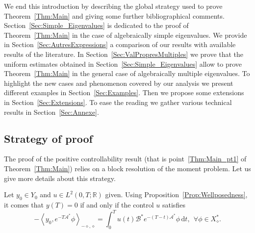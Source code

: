 \documentclass[10pt]{amsart}
\theoremstyle{definition}\newtheorem{defi}[theo]{Definition}\newtheorem{rema}[theo]{Remark}\newtheorem{exam}[theo]{Example}\newtheorem{exem}[theo]{Example}\newtheorem{nota}[theo]{Notation}
\newcommand\As{\mathcal{A}^*}
\newcommand\Bs{\mathcal{B}^*}
\newcommand{\Xalphas}{X_\diamond^*}
\newcommand{\Fzp}{Y_0}
\newcommand{\dual}[2]{\left\langle #1, #2 \right\rangle_{-\diamond,\diamond}}
\newcommand{\R}{\mathbb{R}}
\newcommand{\md}{\mathrm{d}}
\let\oldforall\forall
\renewcommand*{\forall}{\mathrel{\oldforall}}
\begin{document}
We end this introduction by describing the global strategy used to prove Theorem~\ref{Thm:Main} and giving some further bibliographical comments. Section~\ref{Sec:Simple_Eigenvalues} is dedicated to the proof of Theorem~\ref{Thm:Main} in the case of algebraically simple eigenvalues. We provide in Section~\ref{Sec:AutresExpressions} a comparison of our results with available results of the literature. In Section~\ref{Sec:ValPropresMultiples} we prove that the uniform estimates obtained in Section~\ref{Sec:Simple_Eigenvalues} allow to prove Theorem~\ref{Thm:Main} in the general case of algebraically multiple eigenvalues. To highlight the new cases and phenomenon covered by our analysis we present different examples in Section~\ref{Sec:Examples}. Then we propose some extensions in Section~\ref{Sec:Extensions}. To ease the reading we gather various technical results in Section~\ref{Sec:Annexe}.


\subsection{Strategy of proof} \label{Subsec:Strategy}


The proof of the positive controllability result (that is point~\eqref{Thm:Main_pt1} of Theorem~\ref{Thm:Main}) relies on a block resolution of the moment problem. Let us give more details about this strategy.

Let $y_0\in \Fzp$ and $u\in L^2(0,T;\R)$ given. Using Proposition~\ref{Prop:Wellposedness}, it comes that $y(T)=0$ if and only if the control $u$ satisfies
\begin{equation}\label{premiere_equation_dualite}
- \dual{y_0}{e^{-T \As} \phi} = \int_0^T u(t) \Bs e^{-(T-t) \As} \phi\, \md t, \ \ \forall \phi\in \Xalphas.
\end{equation}
\end{document}
